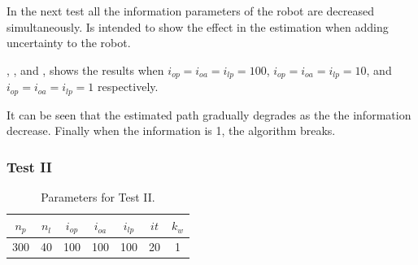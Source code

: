 In the next test all the information parameters of the robot are decreased simultaneously. Is intended to show the effect in the estimation when adding uncertainty to the robot.

, , and , shows the results when $i_{op}=i_{oa}=i_{lp}=100$, $i_{op}=i_{oa}=i_{lp}=10$, and $i_{op}=i_{oa}=i_{lp}=1$ respectively.


It can be seen that the estimated path gradually degrades as the the information decrease. Finally when the information is 1, the algorithm breaks.

\subsubsection{Test II}
\label{sec:test-ii}

\begin{table}[htbp!]
    \centering
    \begin{tabular}{|c|c|c|c|c|c|c|}
        \hline
        $n_p$ & $n_l$ & $i_{op}$ & $i_{oa}$ & $i_{lp}$ & $it$ & $k_w$\\
        \hline \hline
        300 & 40 & 100 & 100 & 100 & 20 & 1\\
        \hline 
    \end{tabular}
    \caption{Parameters for Test II.}
    \label{tab:test-ii}
\end{table}

